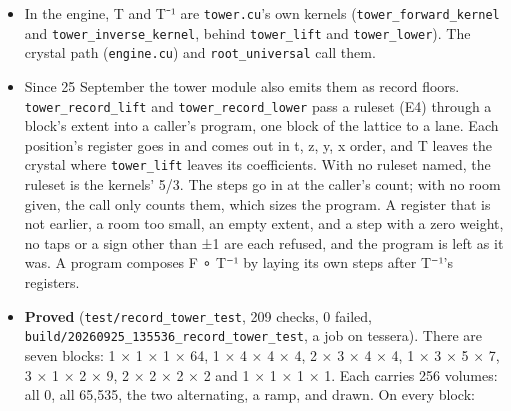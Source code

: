 \begin{itemize}
\begin{itemize}
\begin{itemize}
\item In the engine, T and T⁻¹ are \texttt{tower.\allowbreak{}cu}'s own kernels (\texttt{tower\_\allowbreak{}forward\_\allowbreak{}kernel} and \texttt{tower\_\allowbreak{}inverse\_\allowbreak{}kernel}, behind \texttt{tower\_\allowbreak{}lift} and \texttt{tower\_\allowbreak{}lower}). The crystal path (\texttt{engine.\allowbreak{}cu}) and \texttt{root\_\allowbreak{}universal} call them.
\item Since 25 September the tower module also emits them as record floors. \texttt{tower\_\allowbreak{}record\_\allowbreak{}lift} and \texttt{tower\_\allowbreak{}record\_\allowbreak{}lower} pass a ruleset (E4) through a block's extent into a caller's program, one block of the lattice to a lane. Each position's register goes in and comes out in t, z, y, x order, and T leaves the crystal where \texttt{tower\_\allowbreak{}lift} leaves its coefficients. With no ruleset named, the ruleset is the kernels' 5/3. The steps go in at the caller's count; with no room given, the call only counts them, which sizes the program. A register that is not earlier, a room too small, an empty extent, and a step with a zero weight, no taps or a sign other than ±1 are each refused, and the program is left as it was. A program composes F ∘ T⁻¹ by laying its own steps after T⁻¹'s registers.
\item \textbf{Proved} (\texttt{test/\allowbreak{}record\_\allowbreak{}tower\_\allowbreak{}test}, 209 checks, 0 failed, \texttt{build/\allowbreak{}20260925\_\allowbreak{}135536\_\allowbreak{}record\_\allowbreak{}tower\_\allowbreak{}test}, a job on tessera). There are seven blocks: 1 × 1 × 1 × 64, 1 × 4 × 4 × 4, 2 × 3 × 4 × 4, 1 × 3 × 5 × 7, 3 × 1 × 2 × 9, 2 × 2 × 2 × 2 and 1 × 1 × 1 × 1. Each carries 256 volumes: all 0, all 65,535, the two alternating, a ramp, and drawn. On every block:


\end{itemize}
\end{itemize}
\end{itemize}
